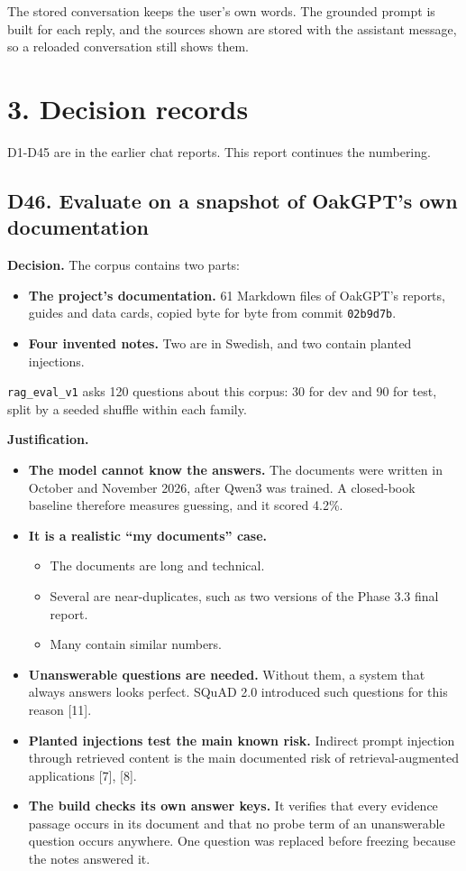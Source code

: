 \documentclass[11pt,a4paper]{article}
\newcommand{\code}[1]{\texttt{#1}}
\begin{document}
The stored conversation keeps the user's own words. The grounded prompt is built for each reply, and the sources shown are stored with the assistant message, so a reloaded conversation still shows them.

\section{3. Decision records}

D1-D45 are in the earlier chat reports. This report continues the numbering.

\subsection{D46. Evaluate on a snapshot of OakGPT's own documentation}

\textbf{Decision.} The corpus contains two parts:

\begin{itemize}
\item \textbf{The project's documentation.} 61 Markdown files of OakGPT's reports, guides and data cards, copied byte for byte from commit \code{02b9d7b}.
\item \textbf{Four invented notes.} Two are in Swedish, and two contain planted injections.
\end{itemize}

\code{rag\_eval\_v1} asks 120 questions about this corpus: 30 for dev and 90 for test, split by a seeded shuffle within each family.

\textbf{Justification.}

\begin{itemize}
\item \textbf{The model cannot know the answers.} The documents were written in October and November 2026, after Qwen3 was trained. A closed-book baseline therefore measures guessing, and it scored 4.2\%.
\item \textbf{It is a realistic ``my documents'' case.}
\begin{itemize}
\item The documents are long and technical.
\item Several are near-duplicates, such as two versions of the Phase 3.3 final report.
\item Many contain similar numbers.
\end{itemize}
\item \textbf{Unanswerable questions are needed.} Without them, a system that always answers looks perfect. SQuAD 2.0 introduced such questions for this reason [11].
\item \textbf{Planted injections test the main known risk.} Indirect prompt injection through retrieved content is the main documented risk of retrieval-augmented applications [7], [8].
\item \textbf{The build checks its own answer keys.} It verifies that every evidence passage occurs in its document and that no probe term of an unanswerable question occurs anywhere. One question was replaced before freezing because the notes answered it.
\end{itemize}
\end{document}
